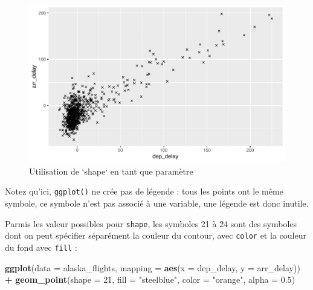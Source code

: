 \documentclass[a4paperpaper,]{article}
\newenvironment{Shaded}{\begin{snugshade}}{\end{snugshade}}
\newcommand{\KeywordTok}[1]{\textcolor[rgb]{0.13,0.29,0.53}{\textbf{#1}}}
\newcommand{\DataTypeTok}[1]{\textcolor[rgb]{0.13,0.29,0.53}{#1}}
\newcommand{\DecValTok}[1]{\textcolor[rgb]{0.00,0.00,0.81}{#1}}
\newcommand{\FloatTok}[1]{\textcolor[rgb]{0.00,0.00,0.81}{#1}}
\newcommand{\StringTok}[1]{\textcolor[rgb]{0.31,0.60,0.02}{#1}}
\newcommand{\OperatorTok}[1]{\textcolor[rgb]{0.81,0.36,0.00}{\textbf{#1}}}
\newcommand{\NormalTok}[1]{#1}
\theoremstyle{definition}
\theoremstyle{definition}
\theoremstyle{definition}
\theoremstyle{remark}
\begin{document}
\begin{figure}[htpb]

{\centering \includegraphics[width=0.9\linewidth]{figure/shapeplot2-1} 

}

\caption{Utilisation de `shape` en tant que paramètre}\label{fig:shapeplot2}
\end{figure}

Notez qu'ici, \texttt{ggplot()} ne crée pas de légende : tous les points
ont le même symbole, ce symbole n'est pas associé à une variable, une
légende est donc inutile.

Parmis les valeur possibles pour \texttt{shape}, les symboles 21 à 24
sont des symboles dont on peut spécifier séparément la couleur du
contour, avec \texttt{color} et la couleur du fond avec \texttt{fill} :

\begin{Shaded}
\begin{Highlighting}[]
\KeywordTok{ggplot}\NormalTok{(}\DataTypeTok{data =}\NormalTok{ alaska_flights, }\DataTypeTok{mapping =} \KeywordTok{aes}\NormalTok{(}\DataTypeTok{x =}\NormalTok{ dep_delay, }\DataTypeTok{y =}\NormalTok{ arr_delay)) }\OperatorTok{+}
\StringTok{  }\KeywordTok{geom_point}\NormalTok{(}\DataTypeTok{shape =} \DecValTok{21}\NormalTok{, }\DataTypeTok{fill =} \StringTok{"steelblue"}\NormalTok{, }\DataTypeTok{color =} \StringTok{"orange"}\NormalTok{, }\DataTypeTok{alpha =} \FloatTok{0.5}\NormalTok{)}
\end{Highlighting}
\end{Shaded}
\end{document}
